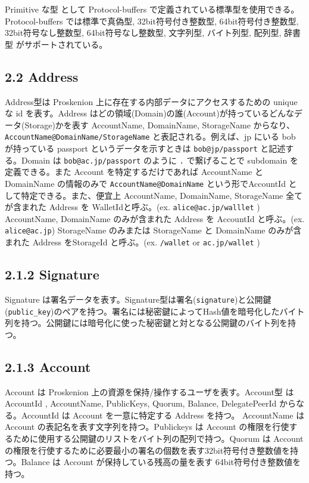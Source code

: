 Primitive な型 として Protocol-buffers
で定義されている標準型を使用できる。Protocol-buffers では標準で真偽型,
32bit符号付き整数型, 64bit符号付き整数型, 32bit符号なし整数型,
64bit符号なし整数型, 文字列型, バイト列型, 配列型, 辞書型
がサポートされている。

\hypertarget{address}{%
\subsection{2.2 Address}\label{address}}

Address型は Proskenion 上に存在する内部データにアクセスするための unique
な id を表す。Address
はどの領域(Domain)の誰(Account)が持っているどんなデータ(Storage)かを表す
AccountName, DomainName, StorageName からなり、
\texttt{AccountName@DomainName/StorageName} と表記される。例えば、jp
にいる bob が持っている passport というデータを示すときは
\texttt{bob@jp/passport} と記述する。Domain は
\texttt{bob@ac.jp/passport} のように \texttt{.} で繋げることで subdomain
を定義できる。また Account を特定するだけであれば AccountName と
DomainName の情報のみで \texttt{AccountName@DomainName}
という形でAccountId として特定できる。また、便宜上 AccountName,
DomainName, StorageName 全てが含まれた Address を WalletIdと呼ぶ。(ex.
\texttt{alice@ac.jp/walllet} ) AccountName, DomainName のみが含まれた
Address を AccountId と呼ぶ。(ex. \texttt{alice@ac.jp}) StorageName
のみまたは StorageName と DomainName のみが含まれた Address をStorageId
と呼ぶ。(ex. \texttt{/wallet} or \texttt{ac.jp/wallet} )

\hypertarget{signature}{%
\subsection{2.1.2 Signature}\label{signature}}

Signature
は署名データを表す。Signature型は署名(\texttt{signature})と公開鍵(\texttt{public\_key})のペアを持つ。署名には秘密鍵によってHash値を暗号化したバイト列を持つ。公開鍵には暗号化に使った秘密鍵と対となる公開鍵のバイト列を持つ。

\hypertarget{account}{%
\subsection{2.1.3 Account}\label{account}}

Account は Proskenion 上の資源を保持/操作するユーザを表す。Account型 は
AccountId , AccountName, PublicKeys, Quorum, Balance, DelegatePeerId
からなる。AccountId は Account を一意に特定する Address を持つ。
AccountName は Account の表記名を表す文字列を持つ。Publickeys は Account
の権限を行使するために使用する公開鍵のリストをバイト列の配列で持つ。Quorum
は Account
の権限を行使するために必要最小の署名の個数を表す32bit符号付き整数値を持つ。Balance
は Account が保持している残高の量を表す 64bit符号付き整数値を持つ。

